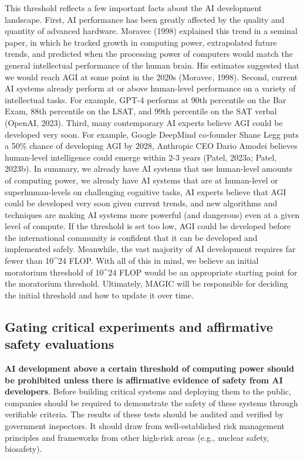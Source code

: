 \documentclass[12pt,a4paper]{article}
\begin{document}
This threshold reflects a few important facts about the AI development landscape. First, AI performance has been greatly affected by the quality and quantity of advanced hardware. Moravec (1998) explained this trend in a seminal paper, in which he tracked growth in computing power, extrapolated future trends, and predicted when the processing power of computers would match the general intellectual performance of the human brain. His estimates suggested that we would reach AGI at some point in the 2020s (Moravec, 1998). Second, current AI systems already perform at or above human-level performance on a variety of intellectual tasks. For example, GPT-4 performs at 90th percentile on the Bar Exam, 88th percentile on the LSAT, and 99th percentile on the SAT verbal (OpenAI, 2023). Third, many contemporary AI experts believe AGI could be developed very soon. For example, Google DeepMind co-founder Shane Legg puts a 50\% chance of developing AGI by 2028, Anthropic CEO Dario Amodei believes human-level intelligence could emerge within 2-3 years (Patel, 2023a; Patel, 2023b). In summary, we already have AI systems that use human-level amounts of computing power, we already have AI systems that are at human-level or superhuman-levels on challenging cognitive tasks, AI experts believe that AGI could be developed very soon given current trends, and new algorithms and techniques are making AI systems more powerful (and dangerous) even at a given level of compute. If the threshold is set too low, AGI could be developed before the international community is confident that it can be developed and implemented safely. Meanwhile, the vast majority of AI development requires far fewer than 10\^{}24 FLOP. With all of this in mind, we believe an initial moratorium threshold of 10\^{}24 FLOP would be an appropriate starting point for the moratorium threshold. Ultimately, MAGIC will be responsible for deciding the initial threshold and how to update it over time.

\subsection{Gating critical experiments and affirmative safety evaluations }

\textbf{AI development above a certain threshold of computing power should be prohibited unless there is affirmative evidence of safety from AI developers}. Before building critical systems and deploying them to the public, companies should be required to demonstrate the safety of these systems through verifiable criteria. The results of these tests should be audited and verified by government inspectors. It should draw from well-established risk management principles and frameworks from other high-risk areas (e.g., nuclear safety, biosafety). 
\end{document}
